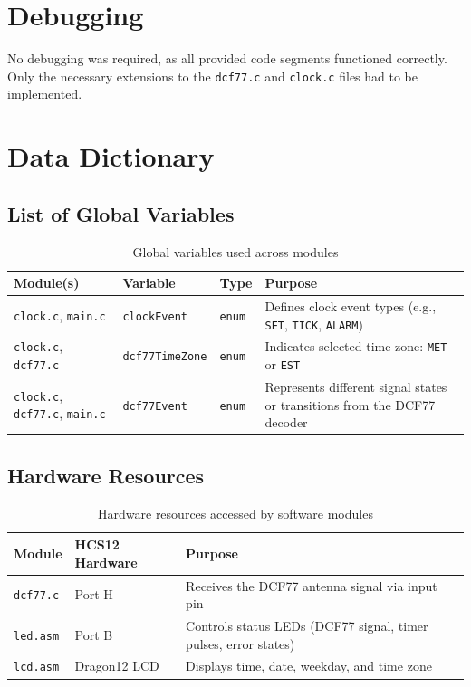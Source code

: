 \documentclass[a4paper,12pt]{article}
\begin{document}
\section{Debugging}

No debugging was required, as all provided code segments functioned correctly.  
Only the necessary extensions to the \texttt{dcf77.c} and \texttt{clock.c} files had to be implemented.

\newpage


\section{Data Dictionary}

\subsection{List of Global Variables}

\begin{table}[H]
\centering
\renewcommand{\arraystretch}{1.3}
\begin{tabularx}{\textwidth}{|L{3.5cm}|L{2.8cm}|L{1.8cm}|X|}
\hline
\textbf{Module(s)} & \textbf{Variable} & \textbf{Type} & \textbf{Purpose} \\
\hline
\texttt{clock.c}, \texttt{main.c} & \texttt{clockEvent} & \texttt{enum} & Defines clock event types (e.g., \texttt{SET}, \texttt{TICK}, \texttt{ALARM}) \\
\hline
\texttt{clock.c}, \texttt{dcf77.c} & \texttt{dcf77TimeZone} & \texttt{enum} & Indicates selected time zone: \texttt{MET} or \texttt{EST} \\
\hline
\texttt{clock.c}, \texttt{dcf77.c}, \texttt{main.c} & \texttt{dcf77Event} & \texttt{enum} & Represents different signal states or transitions from the DCF77 decoder \\
\hline
\end{tabularx}
\caption{Global variables used across modules}
\end{table}


\subsection{Hardware Resources}

\begin{table}[H]
\centering
\renewcommand{\arraystretch}{1.3}
\begin{tabularx}{\textwidth}{|L{3cm}|L{3.5cm}|X|}
\hline
\textbf{Module} & \textbf{HCS12 Hardware} & \textbf{Purpose} \\
\hline
\texttt{dcf77.c} & Port H & Receives the DCF77 antenna signal via input pin \\
\hline
\texttt{led.asm} & Port B & Controls status LEDs (DCF77 signal, timer pulses, error states) \\
\hline
\texttt{lcd.asm} & Dragon12 LCD & Displays time, date, weekday, and time zone \\
\hline
\end{tabularx}
\caption{Hardware resources accessed by software modules}
\end{table}
\end{document}
